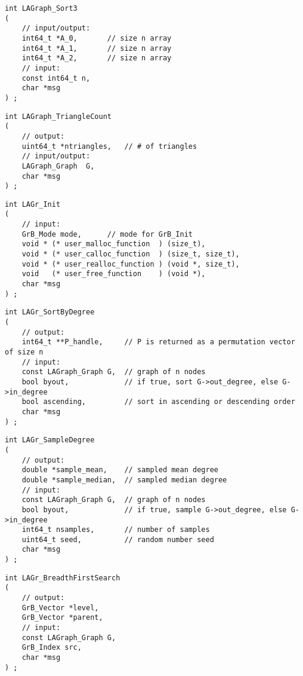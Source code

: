 \begin{verbatim}
int LAGraph_Sort3
(
    // input/output:
    int64_t *A_0,       // size n array
    int64_t *A_1,       // size n array
    int64_t *A_2,       // size n array
    // input:
    const int64_t n,
    char *msg
) ;
\end{verbatim}




\begin{verbatim}
int LAGraph_TriangleCount
(
    // output:
    uint64_t *ntriangles,   // # of triangles
    // input/output:
    LAGraph_Graph  G,
    char *msg
) ;
\end{verbatim}




\begin{verbatim}
int LAGr_Init
(
    // input:
    GrB_Mode mode,      // mode for GrB_Init
    void * (* user_malloc_function  ) (size_t),
    void * (* user_calloc_function  ) (size_t, size_t),
    void * (* user_realloc_function ) (void *, size_t),
    void   (* user_free_function    ) (void *),
    char *msg
) ;
\end{verbatim}




\begin{verbatim}
int LAGr_SortByDegree
(
    // output:
    int64_t **P_handle,     // P is returned as a permutation vector of size n
    // input:
    const LAGraph_Graph G,  // graph of n nodes
    bool byout,             // if true, sort G->out_degree, else G->in_degree
    bool ascending,         // sort in ascending or descending order
    char *msg
) ;
\end{verbatim}




\begin{verbatim}
int LAGr_SampleDegree
(
    // output:
    double *sample_mean,    // sampled mean degree
    double *sample_median,  // sampled median degree
    // input:
    const LAGraph_Graph G,  // graph of n nodes
    bool byout,             // if true, sample G->out_degree, else G->in_degree
    int64_t nsamples,       // number of samples
    uint64_t seed,          // random number seed
    char *msg
) ;
\end{verbatim}




\begin{verbatim}
int LAGr_BreadthFirstSearch
(
    // output:
    GrB_Vector *level,
    GrB_Vector *parent,
    // input:
    const LAGraph_Graph G,
    GrB_Index src,
    char *msg
) ;
\end{verbatim}




